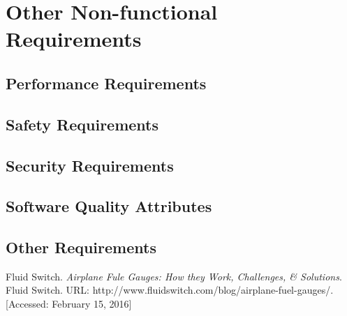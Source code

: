 \documentclass[10pt, a4paper, onecolumn]{scrartcl}
\begin{document}
	\section{Other Non-functional Requirements}
	
		\subsection{Performance Requirements}
		
		\subsection{Safety Requirements}
		
		\subsection{Security Requirements}
		
		\subsection{Software Quality Attributes}
		
		\subsection{Other Requirements}
	
	\begin{thebibliography}{99}
		Fluid Switch. \textit{Airplane Fule Gauges: How they Work, Challenges, \& Solutions}. Fluid Switch. URL: http://www.fluidswitch.com/blog/airplane-fuel-gauges/. [Accessed: February 15, 2016]
	\end{thebibliography}
	
	
	
	
	
\end{document}
